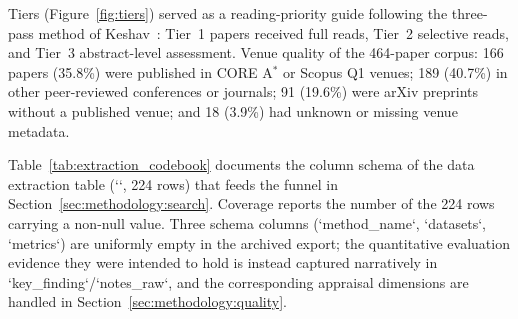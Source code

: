 Tiers (Figure~\ref{fig:tiers}) served as a reading-priority guide following the three-pass method of
Keshav~\cite{Keshav2007}: Tier~1 papers received full reads, Tier~2
selective reads, and Tier~3 abstract-level assessment. Venue quality of the
464-paper corpus: 166 papers (35.8\%) were published in CORE A$^*$ or Scopus
Q1 venues; 189 (40.7\%) in other peer-reviewed conferences or journals; 91
(19.6\%) were arXiv preprints without a published venue; and 18 (3.9\%) had
unknown or missing venue metadata.

Table~\ref{tab:extraction_codebook} documents the column schema of the data
extraction table (`\texttt{}`, 224 rows) that feeds
the funnel in Section~\ref{sec:methodology:search}. Coverage reports the number
of the 224 rows carrying a non-null value. Three schema columns
(`method\_name`, `datasets`, `metrics`) are uniformly empty in the archived
export; the quantitative evaluation evidence they were intended to hold is
instead captured narratively in `key\_finding`/`notes\_raw`, and the
corresponding appraisal dimensions are handled in
Section~\ref{sec:methodology:quality}.

